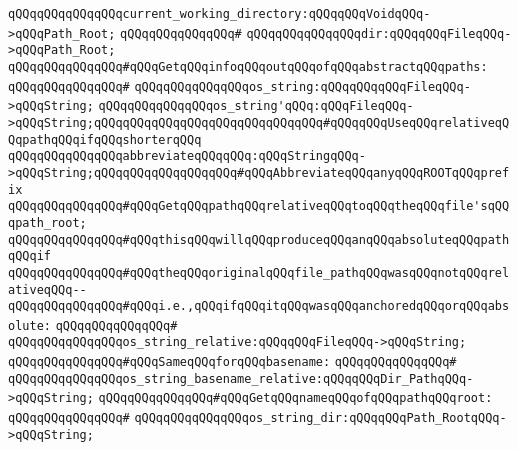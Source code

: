 \verb|qQQqqQQqqQQqqQQqcurrent_working_directory:qQQqqQQqVoidqQQq->qQQqPath_Root;|\newline
\verb|qQQqqQQqqQQqqQQq#|\newline
\verb|qQQqqQQqqQQqqQQqdir:qQQqqQQqFileqQQq->qQQqPath_Root;|\newline
\newline
\verb|qQQqqQQqqQQqqQQq#qQQqGetqQQqinfoqQQqoutqQQqofqQQqabstractqQQqpaths:|\newline
\verb|qQQqqQQqqQQqqQQq#|\newline
\verb|qQQqqQQqqQQqqQQqos_string:qQQqqQQqqQQqFileqQQq->qQQqString;|\newline
\verb|qQQqqQQqqQQqqQQqos_string'qQQq:qQQqFileqQQq->qQQqString;qQQqqQQqqQQqqQQqqQQqqQQqqQQqqQQq#qQQqqQQqUseqQQqrelativeqQQqpathqQQqifqQQqshorterqQQq|\newline
\newline
\verb|qQQqqQQqqQQqqQQqabbreviateqQQqqQQq:qQQqStringqQQq->qQQqString;qQQqqQQqqQQqqQQqqQQq#qQQqAbbreviateqQQqanyqQQqROOTqQQqprefix|\newline
\newline
\verb|qQQqqQQqqQQqqQQq#qQQqGetqQQqpathqQQqrelativeqQQqtoqQQqtheqQQqfile'sqQQqpath_root;|\newline
\verb|qQQqqQQqqQQqqQQq#qQQqthisqQQqwillqQQqproduceqQQqanqQQqabsoluteqQQqpathqQQqif|\newline
\verb|qQQqqQQqqQQqqQQq#qQQqtheqQQqoriginalqQQqfile_pathqQQqwasqQQqnotqQQqrelativeqQQq--|\newline
\verb|qQQqqQQqqQQqqQQq#qQQqi.e.,qQQqifqQQqitqQQqwasqQQqanchoredqQQqorqQQqabsolute:|\newline
\verb|qQQqqQQqqQQqqQQq#|\newline
\verb|qQQqqQQqqQQqqQQqos_string_relative:qQQqqQQqFileqQQq->qQQqString;|\newline
\newline
\verb|qQQqqQQqqQQqqQQq#qQQqSameqQQqforqQQqbasename:|\newline
\verb|qQQqqQQqqQQqqQQq#|\newline
\verb|qQQqqQQqqQQqqQQqos_string_basename_relative:qQQqqQQqDir_PathqQQq->qQQqString;|\newline
\newline
\verb|qQQqqQQqqQQqqQQq#qQQqGetqQQqnameqQQqofqQQqpathqQQqroot:|\newline
\verb|qQQqqQQqqQQqqQQq#|\newline
\verb|qQQqqQQqqQQqqQQqos_string_dir:qQQqqQQqPath_RootqQQq->qQQqString;|\newline
\newline
